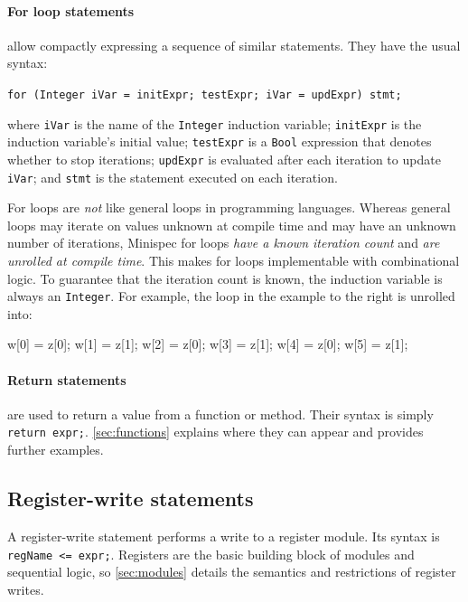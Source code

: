 \paragraph{For loop statements} allow compactly expressing a sequence of similar statements. They have the usual syntax:
\begin{center}
\verb|for (Integer iVar = initExpr; testExpr; iVar = updExpr) stmt;|\
\end{center}
where \verb|iVar| is the name of the \verb|Integer| induction variable;
\verb|initExpr| is the induction variable's initial value;
\verb|testExpr| is a \verb|Bool| expression that denotes whether to stop iterations;
\verb|updExpr| is evaluated after each iteration to update \verb|iVar|;
and \verb|stmt| is the statement executed on each iteration.

For loops are \emph{not} like general loops in programming languages.
Whereas general loops may iterate on values unknown at compile time and may have an unknown number of iterations,
Minispec for loops \emph{have a known iteration count} and \emph{are unrolled at compile time}.
This makes for loops implementable with combinational logic.
To guarantee that the iteration count is known, the induction variable is always an \verb|Integer|.
For example, the loop in the example to the right is unrolled into:

\begin{mscode}
  w[0] = z[0];  w[1] = z[1];  w[2] = z[0];  w[3] = z[1];  w[4] = z[0];  w[5] = z[1];
\end{mscode}

\paragraph{Return statements} are used to return a value from a function or method. Their syntax is simply \verb|return expr;|.
\autoref{sec:functions} explains where they can appear and provides further examples.

\subsection{Register-write statements}

A register-write statement performs a write to a register module.
Its syntax is \verb|regName <= expr;|.
Registers are the basic building block of modules and sequential logic,
so \autoref{sec:modules} details the semantics and restrictions of register writes.
